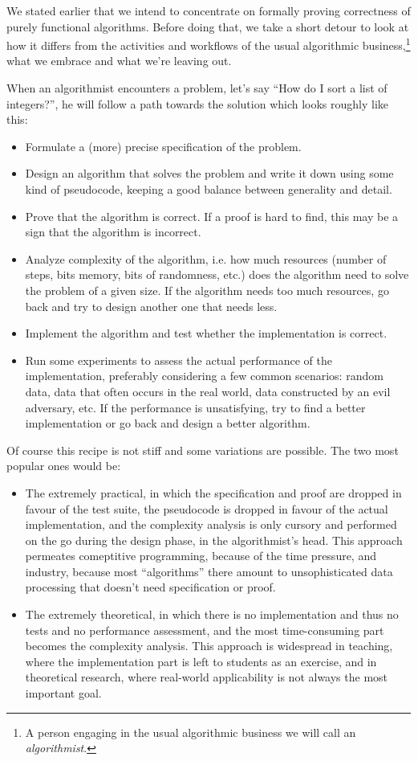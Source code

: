 \documentclass[declaration,mgr,english,shortabstract]{iithesis}
\begin{document}
We stated earlier that we intend to concentrate on formally proving correctness of purely functional algorithms. Before doing that, we take a short detour to look at how it differs from the activities and workflows of the usual algorithmic business,\footnote{A person engaging in the usual algorithmic business we will call an \textit{algorithmist}.} what we embrace and what we're leaving out.

When an algorithmist encounters a problem, let's say ``How do I sort a list of integers?'', he will follow a path towards the solution which looks roughly like this:

\begin{itemize}
    \item Formulate a (more) precise specification of the problem.
    \item Design an algorithm that solves the problem and write it down using some kind of pseudocode, keeping a good balance between generality and detail.
    \item Prove that the algorithm is correct. If a proof is hard to find, this may be a sign that the algorithm is incorrect.
    \item Analyze complexity of the algorithm, i.e. how much resources (number of steps, bits memory, bits of randomness, etc.) does the algorithm need to solve the problem of a given size. If the algorithm needs too much resources, go back and try to design another one that needs less.
    \item Implement the algorithm and test whether the implementation is correct.
    \item Run some experiments to assess the actual performance of the implementation, preferably considering a few common scenarios: random data, data that often occurs in the real world, data constructed by an evil adversary, etc. If the performance is unsatisfying, try to find a better implementation or go back and design a better algorithm.
\end{itemize}

Of course this recipe is not stiff and some variations are possible. The two most popular ones would be:

\begin{itemize}
    \item The extremely practical, in which the specification and proof are dropped in favour of the test suite, the pseudocode is dropped in favour of the actual implementation, and the complexity analysis is only cursory and performed on the go during the design phase, in the algorithmist's head. This approach permeates comeptitive programming, because of the time pressure, and industry, because most ``algorithms'' there amount to unsophisticated data processing that doesn't need specification or proof.
    \item The extremely theoretical, in which there is no implementation and thus no tests and no performance assessment, and the most time-consuming part becomes the complexity analysis. This approach is widespread in teaching, where the implementation part is left to students as an exercise, and in theoretical research, where real-world applicability is not always the most important goal.
\end{itemize}
\end{document}
